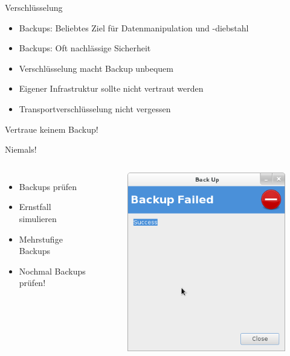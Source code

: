 \documentclass[10pt]{beamer}
\begin{document}
%
%
\begin{frame}[fragile]{Verschlüsselung}
	\begin{itemize}
	\item Backups: Beliebtes Ziel für Datenmanipulation und -diebstahl
	\item Backups: Oft nachlässige Sicherheit
	\item Verschlüsselung macht Backup unbequem
	\item Eigener Infrastruktur sollte nicht vertraut werden
	\item Transportverschlüsselung nicht vergessen
\end{itemize}
\end{frame}

%
%
\begin{frame}[fragile]{Vertraue keinem Backup!}
\begin{alertblock}{Niemals!}
\end{alertblock}
\begin{columns}[T,c,onlytextwidth]
	\begin{itemize}
		\item Backups prüfen
		\item Ernstfall simulieren
		\item Mehrstufige Backups
		\item Nochmal Backups prüfen!
	\end{itemize}
	\begin{figure}
		\includegraphics[width=1\textwidth]{images/failed-backup}
	\end{figure}
\end{columns}


\end{frame}
\end{document}
